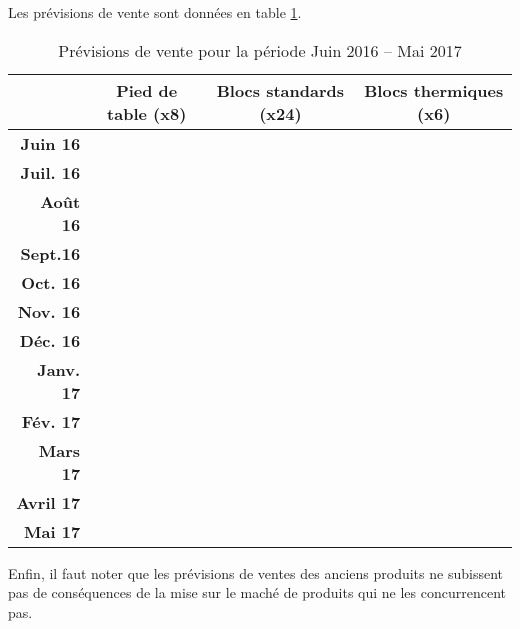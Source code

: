 Les prévisions de vente sont données en table \ref{prevVente}.
\begin{table}[!ht]
	\centering
	\begin{tabular}{>{\bfseries}rccc}
		\toprule
		& \textbf{Pied de table (x8)} & \textbf{Blocs standards (x24)} &
		\textbf{Blocs
		thermiques (x6)} \\
		\midrule
		Juin 16 & \\
		Juil. 16 & \\
		Août 16 & \\
		Sept.16 & \\
		Oct. 16 &\\
		Nov. 16 & \\
		Déc. 16 & \\
		Janv. 17 & \\
		Fév. 17 & \\
		Mars 17 & \\
		Avril 17 & \\
		Mai 17 &\\
		\bottomrule
	\end{tabular}
	\caption{Prévisions de vente pour la période Juin 2016 -- Mai
	2017\label{prevVente}}
\end{table}

Enfin, il faut noter que les prévisions de ventes des anciens produits
ne subissent pas de conséquences de la mise sur le maché de produits qui
ne les concurrencent pas.
